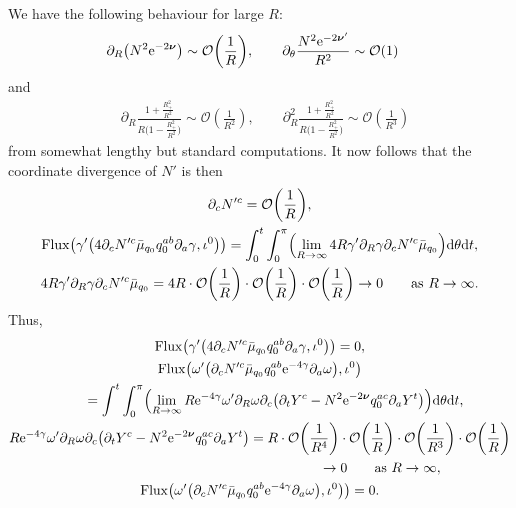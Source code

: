 \documentclass[11pt]{article}
\numberwithin{equation}{section}
\def\ptl{\partial}%
\def\mbo#1{\boldsymbol{#1}}%
\numberwithin{equation}{section}
\begin{document}
We have the following behaviour for large $R$:
\begin{align*}
& \ptl_R \bigl(N^2 {\rm e}^{-2 \mbo{\nu}}\bigr) \sim \mathcal{O}\biggl(\frac{1}{R}\biggr),
\qquad \ptl_\theta \frac{N^2 {\rm e}^{-2 \mbo{\nu}'}}{R^2} \sim \mathcal{O} (1)
\end{align*}
and
\begin{align*}
& \ptl_R \frac{ 1 + \frac{R^2_+}{R^2}}{ R \bigl(1- \frac{R^2_+}{R^2}\bigr)} \sim \mathcal{O} (\frac{1}{R^2}), \qquad \ptl^2_R \frac{ 1 + \frac{R^2_+}{R^2}}{ R \bigl(1- \frac{R^2_+}{R^2}\bigr)} \sim \mathcal{O} (\frac{1}{R^3})
\end{align*}
from somewhat lengthy but standard computations. It now follows that the coordinate divergence of $N'$ is then
\begin{gather*}
\ptl_c N'^c = \mathcal{O} \biggl(\frac{1}{R}\biggr),
\\
{\rm Flux} \bigl(\gamma' \bigl(4 \ptl_c N'^c \bar{\mu}_{q_0} q^{ab} _0 \ptl_a \gamma, \iota^0\bigr)\bigr) =
\int^t_0 \int^\pi_0 \Bigl(\lim_{R \to \infty} 4 R \gamma' \ptl_R \gamma \ptl_c N'^c \bar{\mu}_{q_0}\Bigr) {\rm d} \theta {\rm d}t,
\\
4 R \gamma' \ptl_R \gamma \ptl_c N'^c \bar{\mu}_{q_0} = 4 R \cdot \mathcal{O} \biggl(\frac{1}{R}\biggr) \cdot \mathcal{O} \biggl(\frac{1}{R}\biggr) \cdot \mathcal{O} \biggl(\frac{1}{R}\biggr)
 \to 0 \qquad \text{as} \ R \to \infty.
\end{gather*}
Thus,
\begin{gather*}
{\rm Flux} \bigl(\gamma' \bigl(4 \ptl_c N'^c \bar{\mu}_{q_0} q^{ab} _0 \ptl_a \gamma, \iota^0\bigr)\bigr) =0,
\\
{\rm Flux} \bigl(\omega' \bigl(\ptl_c N'^c \bar{\mu}_{q_0} q^{ab} _0 {\rm e}^{-4 \gamma} \ptl_a \omega\bigr), \iota^0\bigr) \notag\\
 \qquad{} = \int^t \int^\pi_0 \Bigl(\lim_{R \to \infty} R {\rm e}^{-4\gamma} \omega' \ptl_R \omega \ptl_c\bigl(\ptl_t Y^c - N^2 {\rm e}^{-2 \mbo{\nu}} q^{ac}_0 \ptl_a Y^t\bigr)\Bigr) {\rm d} \theta {\rm d}t,
\\
R {\rm e}^{-4\gamma} \omega' \ptl_R \omega \ptl_c\bigl(\ptl_t Y^c - N^2 {\rm e}^{-2 \mbo{\nu}} q^{ac}_0 \ptl_a Y^t\bigr) = R \cdot \mathcal{O} \biggl(\frac{1}{R^4}\biggr) \cdot \mathcal{O} \biggl(\frac{1}{R}\biggr) \cdot \mathcal{O} \biggl(\frac{1}{R^3}\biggr) \cdot \mathcal{O} \biggl(\frac{1}{R}\biggr) \notag\\
\hphantom{R {\rm e}^{-4\gamma} \omega' \ptl_R \omega \ptl_c\bigl(\ptl_t Y^c - N^2 {\rm e}^{-2 \mbo{\nu}} q^{ac}_0 \ptl_a Y^t\bigr)}{}
\to 0 \qquad \text{as} \ R \to \infty,
\\
{\rm Flux} \bigl(\omega' \bigl(\ptl_c N'^c \bar{\mu}_{q_0} q^{ab} _0 {\rm e}^{-4 \gamma} \ptl_a \omega\bigr), \iota^0\bigr)\bigr) =0.
\end{gather*}
\end{document}
